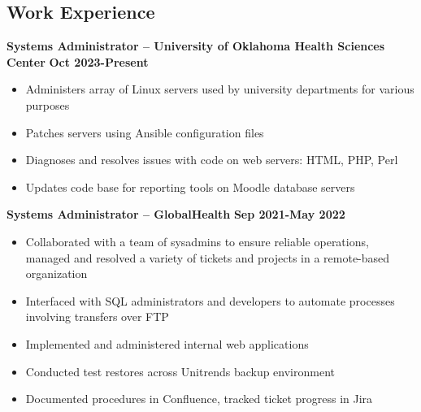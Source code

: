 \documentclass[line]{res}
\begin{document}

\address{Oklahoma City, OK $\parallel$ trjean.ou@gmail.com $\parallel$ (580) 304-6896}

\begin{resume}

\section{Work Experience}

\textbf{Systems Administrator -- University of Oklahoma Health Sciences Center}
\newline
\textbf{Oct 2023-Present}
	\begin{itemize}
	\item Administers array of Linux servers used by university departments for various purposes
	\item Patches servers using Ansible configuration files
	\item Diagnoses and resolves issues with code on web servers: HTML, PHP, Perl
	\item Updates code base for reporting tools on Moodle database servers
	\end{itemize}

\textbf{Systems Administrator -- GlobalHealth}
\newline
\textbf{Sep 2021-May 2022}
\begin{itemize}
	\item Collaborated with a team of sysadmins to ensure reliable operations, managed and resolved a variety of tickets and projects in a remote-based organization
	\item Interfaced with SQL administrators and developers to automate processes involving transfers over FTP
	\item Implemented and administered internal web applications
	\item Conducted test restores across Unitrends backup environment
	\item Documented procedures in Confluence, tracked ticket progress in Jira 
\end{itemize}


\end{resume}
\end{document}
